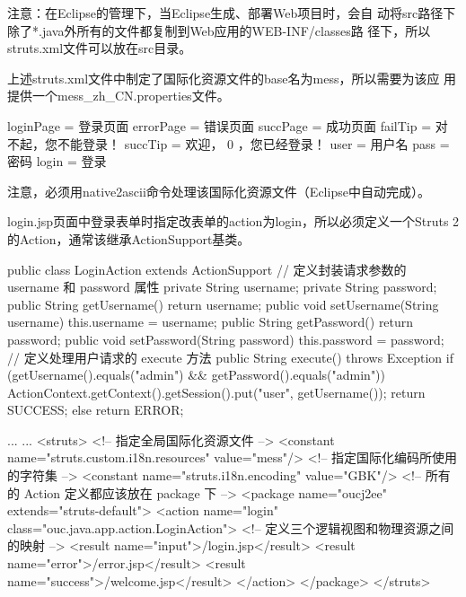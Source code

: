 {\kai\Blue 注意：在Eclipse的管理下，当Eclipse生成、部署Web项目时，会自
  动将src路径下除了*.java外所有的文件都复制到Web应用的WEB-INF/classes路
  径下，所以struts.xml文件可以放在src目录。}

上述struts.xml文件中制定了国际化资源文件的base名为mess，所以需要为该应
用提供一个mess\_zh\_CN.properties文件。


\begin{xmlCode}
  loginPage = 登录页面
  errorPage = 错误页面
  succPage = 成功页面
  failTip = 对不起，您不能登录！
  succTip = 欢迎， {0} ，您已经登录！
  user = 用户名
  pass = 密码
  login = 登录
\end{xmlCode}

注意，必须用native2ascii命令处理该国际化资源文件（Eclipse中自动完成）。

login.jsp页面中登录表单时指定改表单的action为login，所以必须定义一个Struts
2的Action，通常该继承ActionSupport基类。


\begin{javaCode}
  public class LoginAction extends ActionSupport {
    // 定义封装请求参数的 username 和 password 属性
    private String username;
    private String password;
    public String getUsername() {
      return username;
    }
    public void setUsername(String username) {
      this.username = username;
    }
    public String getPassword() {
      return password;
    }
    public void setPassword(String password) {
      this.password = password;
    }
    // 定义处理用户请求的 execute 方法
    public String execute() throws Exception {
      if (getUsername().equals("admin") && getPassword().equals("admin")) {
        ActionContext.getContext().getSession().put("user", getUsername());
        return SUCCESS;
      } else {
        return ERROR;
      }
    }
  }
\end{javaCode}


\begin{xmlCode}
... ...
<struts>
  <!-- 指定全局国际化资源文件 -->
  <constant name="struts.custom.i18n.resources" value="mess"/>
  <!-- 指定国际化编码所使用的字符集 -->	
  <constant name="struts.i18n.encoding" value="GBK"/>
  <!-- 所有的 Action 定义都应该放在 package 下 -->
  <package name="oucj2ee" extends="struts-default">
    <action name="login" class="ouc.java.app.action.LoginAction">
    <!-- 定义三个逻辑视图和物理资源之间的映射 -->		
      <result name="input">/login.jsp</result>
      <result name="error">/error.jsp</result>
      <result name="success">/welcome.jsp</result>
    </action>
  </package>
</struts>
\end{xmlCode}

